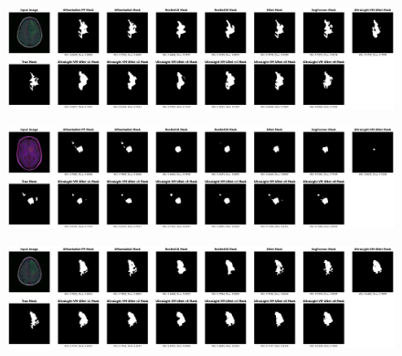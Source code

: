 \documentclass[conference]{IEEEtran}
\begin{document}
\begin{figure}[!h]
    \centering
    \includegraphics[width=\textwidth]{imgs/12_2.png}
\end{figure}
\begin{figure}[!h]
    \centering
    \includegraphics[width=\textwidth]{imgs/22_3.png}
\end{figure}
\begin{figure}[!h]
    \centering
    \includegraphics[width=\textwidth]{imgs/22_7.png}
\end{figure}
\end{document}
